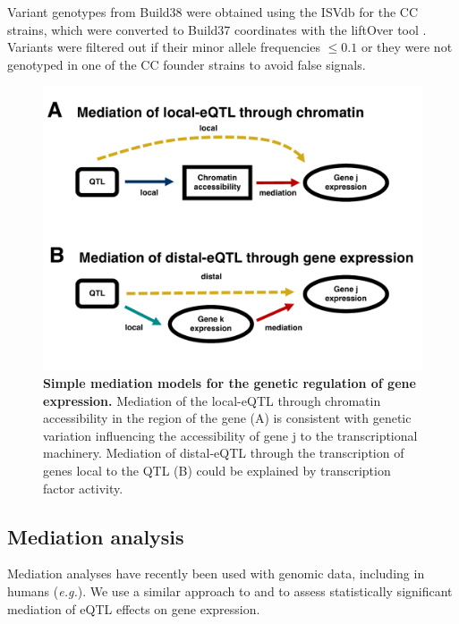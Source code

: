 \documentclass[9pt,twocolumn,twoside]{gsajnl}
\newcommand{\eg}{\emph{e.g.}\xspace}
\begin{document}
Variant genotypes from Build38 were obtained using the ISVdb \citep{Oreper2017} for the CC strains, which were converted to Build37 coordinates with the liftOver tool \citep{Lawrence2009}. Variants were filtered out if their minor allele frequencies $\le 0.1$ or they were not genotyped in one of the CC founder strains to avoid false signals.

\begin{figure}[htbp]
\renewcommand{\familydefault}{\sfdefault}\normalfont
\centering
\includegraphics[width=\linewidth, clip, trim={0in 0.5in 0in 0in}]{figs/mediation_graph.pdf}
\caption{\textbf{Simple mediation models for the genetic regulation of gene expression.} Mediation of the local-eQTL through chromatin accessibility in the region of the gene (A) is consistent with genetic variation influencing the accessibility of gene j to the transcriptional machinery. Mediation of distal-eQTL through the transcription of genes local to the QTL (B) could be explained by transcription factor activity. 
\label{fig:graph}}
\end{figure}

\subsection{Mediation analysis}

Mediation analyses have recently been used with genomic data, including in humans (\eg \citealt{Battle2014}). We use a similar approach to \cite{Chick2016} and \cite{Keller2018} to assess statistically significant mediation of eQTL effects on gene expression.
\end{document}

